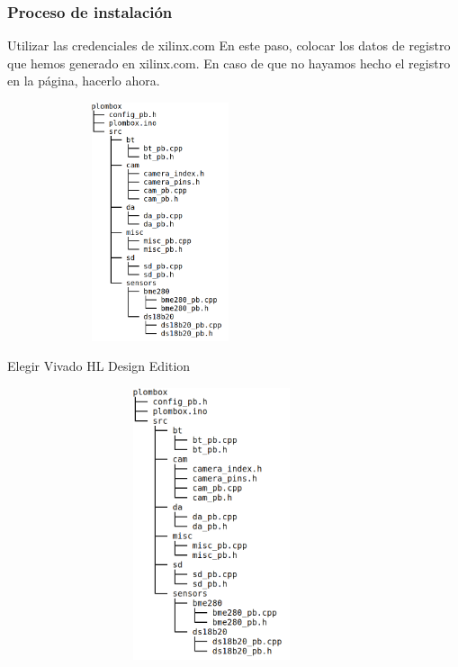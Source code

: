 \documentclass[a4paper,11pt]{article}
\begin{document}
\subsubsection{Proceso de instalación}
  Utilizar las credenciales de xilinx.com
    En este paso, colocar los datos de registro que hemos generado en
    xilinx.com. En caso de que no hayamos hecho el registro en la página,
    hacerlo ahora.
    \begin{center}
    \includegraphics[height=7cm,width=9cm]{tree_dir}
    \end{center}

Elegir Vivado HL Design Edition
    \begin{center}
    \includegraphics[height=8cm,width=12cm]{tree_dir}
    \end{center}
\end{document}
